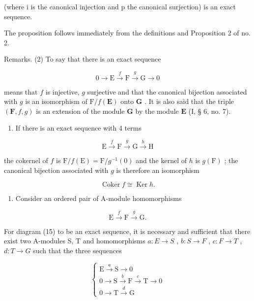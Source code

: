 (where i is the canonical injection and p the canonical surjection) is an exact sequence.

The proposition follows immediately from the definitions and Proposition 2 of no. 2.

Remarks. (2) To say that there is an exact sequence

\[
0 \longrightarrow \mathrm{E} \stackrel {f} {\longrightarrow} \mathrm{F} \stackrel {g} {\longrightarrow} \mathrm{G} \longrightarrow 0
\]

means that \(f\) is injective, \(g\) surjective and that the canonical bijection associated with \(g\) is an isomorphism of \(\mathrm{F} / f(\mathbf{E})\) onto \(\mathbf{G}\) . It is also said that the triple \((\mathbf{F}, f, g)\) is an extension of the module \(\mathbf{G}\) by the module \(\mathbf{E}\) (I, § 6, no. 7).

\begin{enumerate}
\def\labelenumi{(\arabic{enumi})}
\setcounter{enumi}{2}
\tightlist
\item
  If there is an exact sequence with 4 terms
\end{enumerate}

\[
\mathrm{E} \xrightarrow {f} \mathrm{F} \xrightarrow {g} \mathrm{G} \xrightarrow {h} \mathrm{H}
\]

the cokernel of \(f\) is \(\mathrm{F} / f(\mathrm{E}) = \mathrm{F} / g^{-1}(0)\) and the kernel of \(h\) is \(g(\mathrm{F})\) ; the canonical bijection associated with \(g\) is therefore an isomorphism

\[
\operatorname{Coker} f \cong \operatorname{Ker} h.
\]

\begin{enumerate}
\def\labelenumi{(\arabic{enumi})}
\setcounter{enumi}{3}
\tightlist
\item
  Consider an ordered pair of A-module homomorphisms
\end{enumerate}

\[
\mathrm{E} \xrightarrow {f} \mathrm{F} \xrightarrow {g} \mathrm{G}.\tag{15}
\]

For diagram (15) to be an exact sequence, it is necessary and sufficient that there exist two A-modules S, T and homomorphisms \(a:E\to S\) , \(b:S\to F\) , \(c:F\to T\) , \(d:T\to G\) such that the three sequences

\[
\left\{ \begin{array}{c} \mathrm{E} \xrightarrow {a} \mathrm{S} \longrightarrow 0 \\ 0 \longrightarrow \mathrm{S} \xrightarrow {b} \mathrm{F} \xrightarrow {c} \mathrm{T} \longrightarrow 0 \\ 0 \longrightarrow \mathrm{T} \xrightarrow {d} \mathrm{G} \end{array} \right.\tag{16}
\]

